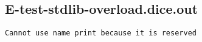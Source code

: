\subsection{E-test-stdlib-overload.dice.out}
\begin{verbatim}
Cannot use name print because it is reserved

\end{verbatim}